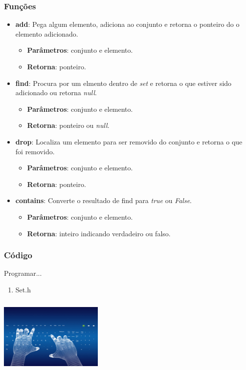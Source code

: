 \documentclass{beamer}
\begin{document}
\begin{frame}
  \frametitle{Funções}

  \begin{itemize}
   \item \textbf{add}: Pega algum elemento, adiciona ao conjunto e retorna o 
    ponteiro do o elemento adicionado.
    \begin{itemize}
     \item \textbf{Parâmetros}: conjunto e elemento.
     \item \textbf{Retorna}: ponteiro.
    \end{itemize}
 
   \item \textbf{find}: Procura por um elmento dentro de \textit{set} e retorna 
    o que estiver sido adicionado ou retorna \textit{null}.
    \begin{itemize}
     \item \textbf{Parâmetros}: conjunto e elemento.
     \item \textbf{Retorna}: ponteiro ou \textit{null}.
    \end{itemize}

   \item \textbf{drop}: Localiza um elemento para ser removido do conjunto e 
     retorna o que foi removido.
     \begin{itemize}
      \item \textbf{Parâmetros}: conjunto e elemento.
      \item \textbf{Retorna}: ponteiro.
     \end{itemize}

   \item \textbf{contains}: Converte o resultado de find para \textit{true} ou 
      \textit{False}.
      \begin{itemize}
       \item \textbf{Parâmetros}: conjunto e elemento.
       \item \textbf{Retorna}: inteiro indicando verdadeiro ou falso.
      \end{itemize}

  \end{itemize}
 
\end{frame}

\begin{frame}
  \frametitle{Código}
  Programar...
  \begin{enumerate}
   \item Set.h
  \end{enumerate}

  \begin{center}
    \includegraphics[height = 1.5in, width = 2in]{image/programming.jpg}
  \end{center}
\end{frame}
\end{document}
